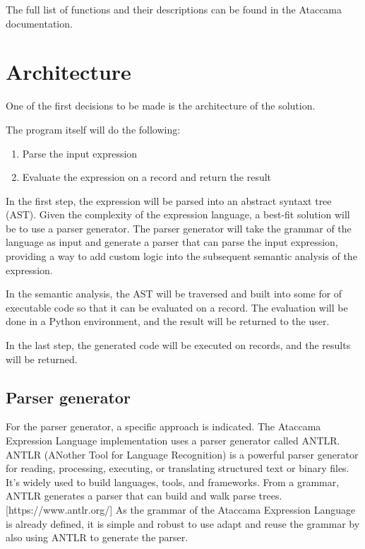     The full list of functions and their descriptions can be found in the Ataccama documentation.


\section{Architecture}

One of the first decisions to be made is the architecture of the solution.

The program itself will do the following:

\begin{enumerate}
    \item Parse the input expression
    \item Evaluate the expression on a record and return the result
\end{enumerate}

In the first step, the expression will be parsed into an abstract syntaxt tree (AST). Given the complexity of the expression language, a best-fit solution will be to use a parser generator. The parser generator will take the grammar of the language as input and generate a parser that can parse the input expression, providing a way to add custom logic into the subsequent semantic analysis of the expression.

In the semantic analysis, the AST will be traversed and built into some for of executable code so that it can be evaluated on a record. The evaluation will be done in a Python environment, and the result will be returned to the user.

In the last step, the generated code will be executed on records, and the results will be returned.

\subsection{Parser generator}

For the parser generator, a specific approach is indicated. The Ataccama Expression Language implementation uses a parser generator called ANTLR. ANTLR (ANother Tool for Language Recognition) is a powerful parser generator for reading, processing, executing, or translating structured text or binary files. It's widely used to build languages, tools, and frameworks. From a grammar, ANTLR generates a parser that can build and walk parse trees. [https://www.antlr.org/] As the grammar of the Ataccama Expression Language is already defined, it is simple and robust to use adapt and reuse the grammar by also using ANTLR to generate the parser.

